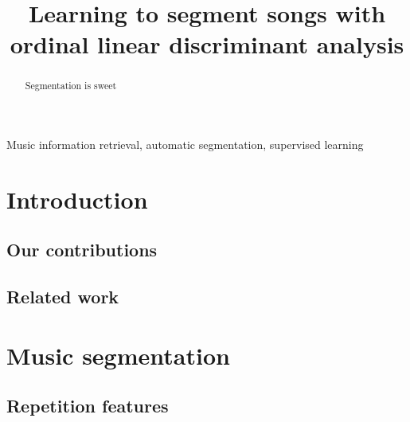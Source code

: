 \documentclass{article}
\title{Learning to segment songs with ordinal linear discriminant analysis}
\begin{document}
%
\maketitle
%
\begin{abstract}
Segmentation is sweet
\end{abstract}
%
\begin{keywords}
Music information retrieval, automatic segmentation, supervised learning
\end{keywords}
%
\section{Introduction}
\label{sec:intro}

\subsection{Our contributions}

\subsection{Related work}
\label{sec:related}

\cite{levy2008structural}
\cite{serra2012unsupervised}

\section{Music segmentation}
\label{sec:features}

\subsection{Repetition features}
\cite{serra2012unsupervised}
\end{document}
